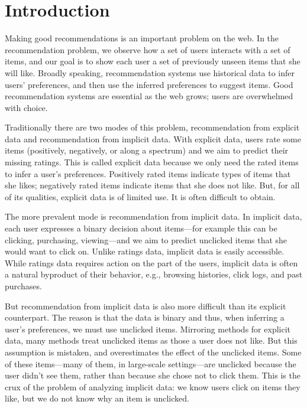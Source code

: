 \section{Introduction}
\label{sec:introduction}


Making good recommendations is an important problem on the web. In the
recommendation problem, we observe how a set of users interacts with a
set of items, and our goal is to show each user a set of previously
unseen items that she will like.  Broadly speaking, recommendation
systems use historical data to infer users' preferences, and then use
the inferred preferences to suggest items.  Good recommendation
systems are essential as the web grows; users are overwhelmed with
choice.

Traditionally there are two modes of this problem, recommendation from
explicit data and recommendation from implicit data.  With explicit
data, users rate some items (positively, negatively, or along a
spectrum) and we aim to predict their missing ratings.  This is called
explicit data because we only need the rated items to infer a user's
preferences. Positively rated items indicate types of items that she
likes; negatively rated items indicate items that she does not like.
But, for all of its qualities, explicit data is of limited use. It is
often difficult to obtain.

The more prevalent mode is recommendation from implicit data.  In
implicit data, each user expresses a binary decision about items---for
example this can be clicking, purchasing, viewing---and we aim to
predict unclicked items that she would want to click on. Unlike
ratings data, implicit data is easily accessible.  While ratings data
requires action on the part of the users, implicit data is often a
natural byproduct of their behavior, e.g., browsing histories, click
logs, and past purchases.

But recommendation from implicit data is also more difficult than its
explicit counterpart.  The reason is that the data is binary and thus,
when inferring a user's preferences, we must use unclicked items.
Mirroring methods for explicit data, many methods treat unclicked
items as those a user does not like.  But this assumption is mistaken,
and overestimates the effect of the unclicked items.  Some of these
items---many of them, in large-scale settings---are unclicked because
the user didn't see them, rather than because she chose not to
click them.  This is the crux of the problem of analyzing implicit
data: we know users click on items they like, but we do not know why
an item is unclicked.

